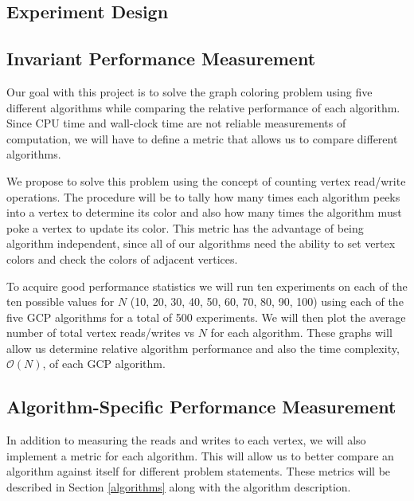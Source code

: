 \documentclass{article}
\begin{document}
\begin{multicols}{2}
\section{Experiment Design}
\subsection{Invariant Performance Measurement}
Our goal with this project is to solve the graph coloring problem using five different algorithms while comparing the relative performance of each algorithm. Since CPU time and wall-clock time are not reliable measurements of computation, we will have to define a metric that allows us to compare different algorithms.\par  We propose to solve this problem using the concept of counting vertex read/write operations. The procedure will be to tally how many times each algorithm peeks into a vertex to determine its color and also how many times the algorithm must poke a vertex to update its color. This metric has the advantage of being algorithm independent, since all of our algorithms need the ability to set vertex colors and check the colors of adjacent vertices.\par
To acquire good performance statistics we will run ten experiments on each of the ten possible values for $N$ (10, 20, 30, 40, 50, 60, 70, 80, 90, 100) using each of the five GCP algorithms for a total of 500 experiments. We will then plot the average number of total vertex reads/writes vs $N$ for each algorithm. These graphs will allow us determine relative algorithm performance and also the time complexity, $\mathcal{O}(N)$, of each GCP algorithm.
\subsection{Algorithm-Specific Performance Measurement}
In addition to measuring the reads and writes to each vertex, we will also implement a metric for each algorithm. This will allow us to better compare an algorithm against itself for different problem statements. These metrics will be described in Section \ref{algorithms} along with the algorithm description.

\end{multicols}
\end{document}
